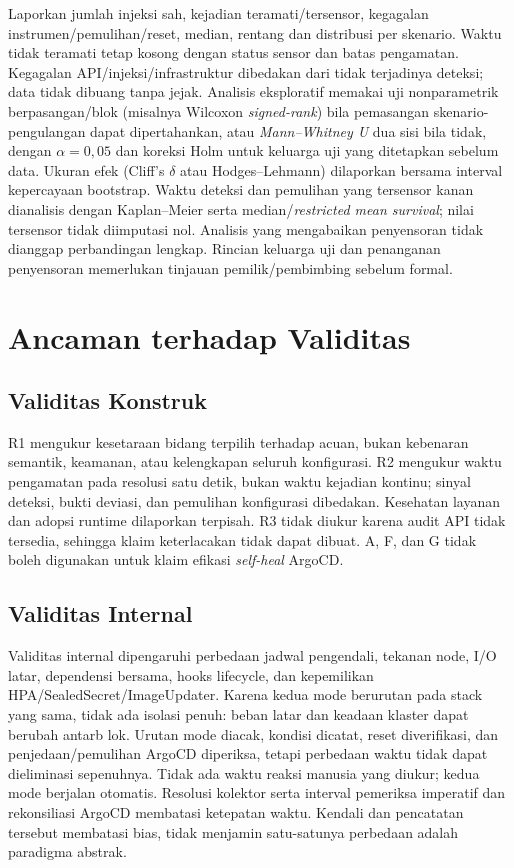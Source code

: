 Laporkan jumlah injeksi sah, kejadian teramati/tersensor, kegagalan instrumen/pemulihan/reset, median, rentang dan distribusi per skenario. Waktu tidak teramati tetap kosong dengan status sensor dan batas pengamatan. Kegagalan API/injeksi/infrastruktur dibedakan dari tidak terjadinya deteksi; data tidak dibuang tanpa jejak. Analisis eksploratif memakai uji nonparametrik berpasangan/blok (misalnya Wilcoxon \textit{signed-rank}) bila pemasangan skenario-pengulangan dapat dipertahankan, atau \textit{Mann--Whitney U} dua sisi bila tidak, dengan $\alpha=0{,}05$ dan koreksi Holm untuk keluarga uji yang ditetapkan sebelum data. Ukuran efek (Cliff's $\delta$ atau Hodges--Lehmann) dilaporkan bersama interval kepercayaan bootstrap. Waktu deteksi dan pemulihan yang tersensor kanan dianalisis dengan Kaplan--Meier serta median/\textit{restricted mean survival}; nilai tersensor tidak diimputasi nol. Analisis yang mengabaikan penyensoran tidak dianggap perbandingan lengkap. Rincian keluarga uji dan penanganan penyensoran memerlukan tinjauan pemilik/pembimbing sebelum formal.

\section{Ancaman terhadap Validitas}

\subsection{Validitas Konstruk}

R1 mengukur kesetaraan bidang terpilih terhadap acuan, bukan kebenaran semantik, keamanan, atau kelengkapan seluruh konfigurasi. R2 mengukur waktu pengamatan pada resolusi satu detik, bukan waktu kejadian kontinu; sinyal deteksi, bukti deviasi, dan pemulihan konfigurasi dibedakan. Kesehatan layanan dan adopsi runtime dilaporkan terpisah. R3 tidak diukur karena audit API tidak tersedia, sehingga klaim keterlacakan tidak dapat dibuat. A, F, dan G tidak boleh digunakan untuk klaim efikasi \textit{self-heal} ArgoCD.

\subsection{Validitas Internal}

Validitas internal dipengaruhi perbedaan jadwal pengendali, tekanan node, I/O latar, dependensi bersama, hooks lifecycle, dan kepemilikan HPA/SealedSecret/ImageUpdater. Karena kedua mode berurutan pada stack yang sama, tidak ada isolasi penuh: beban latar dan keadaan klaster dapat berubah antarb lok. Urutan mode diacak, kondisi dicatat, reset diverifikasi, dan penjedaan/pemulihan ArgoCD diperiksa, tetapi perbedaan waktu tidak dapat dieliminasi sepenuhnya. Tidak ada waktu reaksi manusia yang diukur; kedua mode berjalan otomatis. Resolusi kolektor serta interval pemeriksa imperatif dan rekonsiliasi ArgoCD membatasi ketepatan waktu. Kendali dan pencatatan tersebut membatasi bias, tidak menjamin satu-satunya perbedaan adalah paradigma abstrak.

